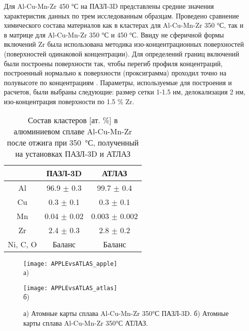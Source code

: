 Для Al-Cu-Mn-Zr 450 °С на ПАЗЛ-3D представлены средние значения характеристик данных по трем исследованным образцам. Проведено сравнение химического состава материалов как в кластерах для Al-Cu-Mn-Zr 350 °С, так и в матрице для Al-Cu-Mn-Zr 350 °С и 450 °С. Ввиду не сферичной формы включений Zr была использована методика изо-концентрационных поверхностей (поверхностей одинаковой концентрации). Для определений границ включений были построены поверхности так, чтобы перегиб профиля концентраций, построенный нормально к поверхности (проксиграмма) проходил точно на полувысоте по концентрациям \cite{Hellman07}. Параметры, используемые для построения и расчетов, были выбраны следующие: размер сетки 1-1.5 нм, делокализация 2 нм, изо-концентрация поверхности по 1.5 \% Zr. 

\begin{table} [htbp]
	\centering
	\caption{Состав кластеров [ат. \%] в алюминиевом сплаве Al-Cu-Mn-Zr после отжига при 350~°С, полученный
		на установках ПАЗЛ-3D и АТЛАЗ}
	\label{tab:matrixAPPLEvsATLAS}
	\begin{SingleSpace}
		\begin{tabular} {| c | c | c |}
			\hline
			{} & ПАЗЛ-3D & АТЛАЗ \\ \hline
			Al       & 96.9 $\pm$ 0.3  & 99.7 $\pm$ 0.4   \\ \hline
			Cu       & 0.3 $\pm$ 0.1   & 0.3 $\pm$ 0.1    \\ \hline
			Mn       & 0.04 $\pm$ 0.02 & 0.003 $\pm$ 0.002  \\ \hline
			Zr       & 2.4 $\pm$ 0.3   & 2.8 $\pm$ 0.2    \\ \hline
			Ni, C, O & Баланс & Баланс   \\ \hline			
		\end{tabular}
	\end{SingleSpace}
\end{table}

\begin{figure}[h!tb]
	\begin{minipage}[b][][b]{0.49\textwidth}\centering
		\texttt{[image: APPLEvsATLAS\_apple]} \\ а)
	\end{minipage}
	\begin{minipage}[b][][b]{0.49\textwidth}\centering
		\texttt{[image: APPLEvsATLAS\_atlas]} \\ б)
	\end{minipage}
	\caption{а) Атомные карты сплава Al-Cu-Mn-Zr 350°С ПАЗЛ-3D. б) Атомные карты сплава Al-Cu-Mn-Zr 350°С АТЛАЗ.}
	\label{fig:APPLEvsATLAS}
\end{figure} 

